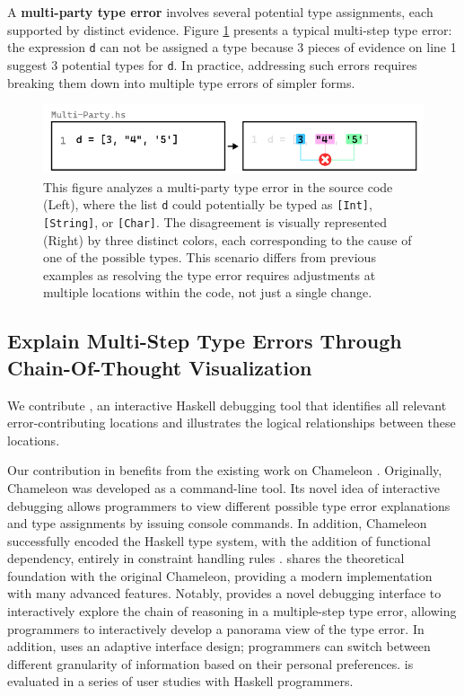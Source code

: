 A \textbf{multi-party type error} involves several potential type assignments, each supported by distinct evidence.  Figure \ref{fig:multi-party-example} presents a typical multi-step type error: the expression \texttt{d} can not be assigned a type because 3 pieces of evidence on line 1 suggest 3 potential types for \texttt{d}. In practice, addressing such errors requires breaking them down into multiple type errors of simpler forms.


\begin{figure}[htbp]
\centering  \includegraphics[width=\linewidth]{Multi-Party}
  \caption[This illustration depicts a multi-party type error in Haskell]{
    \label{fig:multi-party-example}
    This figure analyzes a multi-party type error in the source code (Left), where the list \texttt{d} could potentially be typed as \texttt{[Int]}, \texttt{[String]}, or \texttt{[Char]}. The disagreement is visually represented (Right) by three distinct colors, each corresponding to the cause of one of the possible types. This scenario differs from previous examples as resolving the type error requires adjustments at multiple locations within the code, not just a single change.
       }
\end{figure}



\subsection*{Explain Multi-Step Type Errors Through Chain-Of-Thought Visualization}


We contribute \textbf{\chameleon{}}, an interactive Haskell debugging tool that identifies all relevant error-contributing locations and illustrates the logical relationships between these locations. 


Our contribution in \chameleon{} benefits from the existing work on Chameleon \cite{Stuckey2003-pz, Wazny2006-ll}. Originally,  Chameleon was developed as a command-line tool. Its novel idea of interactive debugging allows programmers to view different possible type error explanations and type assignments by issuing console commands. In addition, Chameleon successfully encoded the Haskell type system, with the addition of functional dependency, entirely in constraint handling rules \cite{Fruhwirth1998-jq}. \chameleon{} shares the theoretical foundation with the original Chameleon, providing a modern implementation with many advanced features. Notably, \chameleon{} provides a novel debugging interface to interactively explore the chain of reasoning in a multiple-step type error, allowing programmers to interactively develop a panorama view of the type error. In addition, \chameleon{} uses an adaptive interface design; programmers can switch between different granularity of information based on their personal preferences. \chameleon{} is evaluated in a series of user studies with Haskell programmers.



